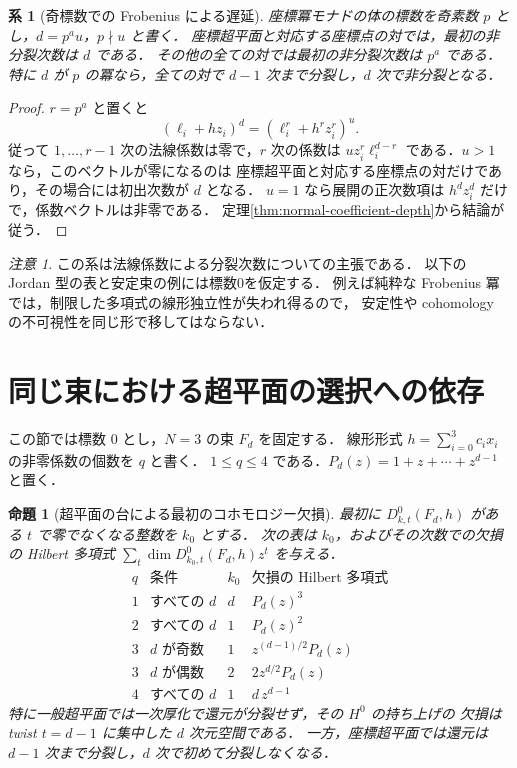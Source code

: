 \documentclass[a4paper,11pt]{ltjsarticle}
\numberwithin{equation}{section}
\theoremstyle{plain}
\newtheorem{proposition}[theorem]{命題}
\newtheorem{corollary}[theorem]{系}
\theoremstyle{definition}
\theoremstyle{remark}
\newtheorem{remark}[theorem]{注意}
\begin{document}
\begin{corollary}[奇標数での Frobenius による遅延]
\label{cor:positive-characteristic-depth}
座標冪モナドの体の標数を奇素数 $p$ とし，$d=p^a u$，$p\nmid u$ と書く．
座標超平面と対応する座標点の対では，最初の非分裂次数は $d$ である．
その他の全ての対では最初の非分裂次数は $p^a$ である．
特に $d$ が $p$ の冪なら，全ての対で $d-1$ 次まで分裂し，$d$ 次で非分裂となる．
\end{corollary}
\begin{proof}
$r=p^a$ と置くと
\[
 (\ell_i+h z_i)^d=(\ell_i^r+h^r z_i^r)^u.
\]
従って $1,\ldots,r-1$ 次の法線係数は零で，$r$ 次の係数は
$u z_i^r\ell_i^{d-r}$ である．$u>1$ なら，このベクトルが零になるのは
座標超平面と対応する座標点の対だけであり，その場合には初出次数が $d$ となる．
$u=1$ なら展開の正次数項は $h^d z_i^d$ だけで，係数ベクトルは非零である．
定理\ref{thm:normal-coefficient-depth}から結論が従う．
\end{proof}

\begin{remark}
この系は法線係数による分裂次数についての主張である．
以下の Jordan 型の表と安定束の例には標数0を仮定する．
例えば純粋な Frobenius 冪では，制限した多項式の線形独立性が失われ得るので，
安定性や cohomology の不可視性を同じ形で移してはならない．
\end{remark}

\section{同じ束における超平面の選択への依存}

この節では標数 $0$ とし，$N=3$ の束 $F_d$ を固定する．
線形形式 $h=\sum_{i=0}^3c_ix_i$ の非零係数の個数を $q$ と書く．
$1\leq q\leq4$ である．$P_d(z)=1+z+\cdots+z^{d-1}$ と置く．

\begin{proposition}[超平面の台による最初のコホモロジー欠損]\label{prop:support-jets}
最初に $D^0_{k,t}(F_d,h)$ がある $t$ で零でなくなる整数を $k_0$ とする．
次の表は $k_0$，およびその次数での欠損の Hilbert 多項式
$\sum_t\dim D^0_{k_0,t}(F_d,h)z^t$ を与える．
\[
\begin{array}{c|c|c|c}
q&\text{条件}&k_0&\text{欠損の Hilbert 多項式}\\ \hline
1&\text{すべての }d&d&P_d(z)^3\\
2&\text{すべての }d&1&P_d(z)^2\\
3&d\text{ が奇数}&1&z^{(d-1)/2}P_d(z)\\
3&d\text{ が偶数}&2&2z^{d/2}P_d(z)\\
4&\text{すべての }d&1&d\,z^{d-1}
\end{array}
\]
特に一般超平面では一次厚化で還元が分裂せず，その $H^0$ の持ち上げの
欠損は twist $t=d-1$ に集中した $d$ 次元空間である．
一方，座標超平面では還元は $d-1$ 次まで分裂し，$d$ 次で初めて分裂しなくなる．
\end{proposition}
\end{document}
